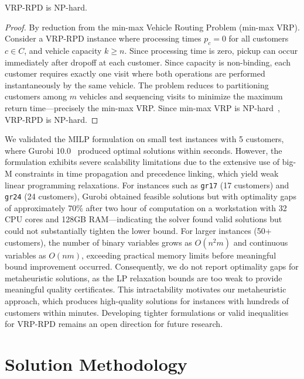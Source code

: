 \documentclass[sigconf]{acmart}
\begin{document}
\begin{theorem}
VRP-RPD is NP-hard.
\end{theorem}

\begin{proof}
By reduction from the min-max Vehicle Routing Problem (min-max VRP). 
Consider a VRP-RPD instance where processing times $p_c = 0$ for all 
customers $c \in C$, and vehicle capacity $k \geq n$. Since processing 
time is zero, pickup can occur immediately after dropoff at each customer. 
Since capacity is non-binding, each customer requires exactly one visit 
where both operations are performed instantaneously by the same vehicle. 
The problem reduces to partitioning customers among $m$ vehicles and 
sequencing visits to minimize the maximum return time---precisely the 
min-max VRP. Since min-max VRP is NP-hard~\cite{lenstra1981complexity}, 
VRP-RPD is NP-hard.
\end{proof}

We validated the MILP formulation on small test instances with 5 customers,
where Gurobi 10.0~\cite{gurobi} produced optimal solutions within seconds.
However, the formulation exhibits severe scalability limitations due to the
extensive use of big-M constraints in time propagation and precedence linking,
which yield weak linear programming relaxations. For instances such as
\texttt{gr17} (17 customers) and \texttt{gr24} (24 customers), Gurobi obtained
feasible solutions but with optimality gaps of approximately 70\% after two hour
of computation on a workstation with 32 CPU cores and 128GB RAM---indicating the
solver found valid solutions but could not substantially tighten the lower
bound. For larger instances (50+ customers), the number of binary variables
grows as $O(n^2 m)$ and continuous variables as $O(nm)$, exceeding practical
memory limits before meaningful bound improvement occurred. Consequently, we do
not report optimality gaps for metaheuristic solutions, as the LP relaxation
bounds are too weak to provide meaningful quality certificates. This
intractability motivates our metaheuristic approach, which produces high-quality
solutions for instances with hundreds of customers within minutes. Developing
tighter formulations or valid inequalities for VRP-RPD remains an open direction
for future research.

\section{Solution Methodology}
\label{sec:methodology}
\end{document}
